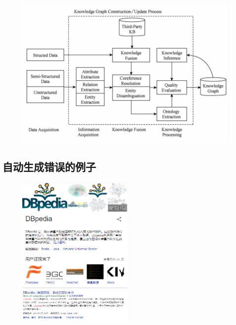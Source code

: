 \begin{frame}
	\begin{figure}[htbp]
		\centering
		\includegraphics[width=\textwidth, bb= 0 0 600 400]{pic/kg/build_kg.png}
	\end{figure}
\end{frame}

\subsection*{自动生成错误的例子}
\begin{frame}
	\begin{figure}[htbp]
		\centering
		\includegraphics[width=0.5\textwidth, bb=0 0 400 400]{pic/kg/DBpedia_1.png}
		\includegraphics[width=0.5\textwidth, bb=0 0 400 400]{pic/kg/DBpedia_2.png}
	\end{figure}
	\begin{figure}[htbp]
		\centering
		
	\end{figure}
\end{frame}

